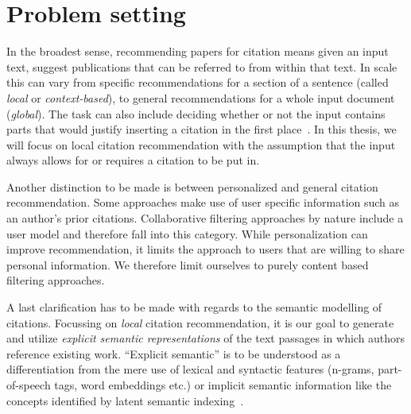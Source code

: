 


\section{Problem setting}\label{sec:problemsetting}
In the broadest sense, recommending papers for citation means given an input text, suggest publications that can be referred to from within that text. In scale this can vary from specific recommendations for a section of a sentence (called \emph{local} or \emph{context-based}), to general recommendations for a whole input document (\emph{global}). The task can also include deciding whether or not the input contains parts that would justify inserting a citation in the first place~\cite{He2011}. In this thesis, we will focus on local citation recommendation with the assumption that the input always allows for or requires a citation to be put in.

Another distinction to be made is between personalized and general citation recommendation. Some approaches make use of user specific information such as an author's prior citations. Collaborative filtering approaches by nature include a user model and therefore fall into this category. While personalization can improve recommendation, it limits the approach to users that are willing to share personal information. %
We therefore limit ourselves to purely content based filtering approaches.

A last clarification has to be made with regards to the semantic modelling of citations. Focussing on \emph{local} citation recommendation, it is our goal to generate and utilize \emph{explicit semantic representations} of the text passages in which authors reference existing work. ``Explicit semantic'' is to be understood as a differentiation from the mere use of lexical and syntactic features (n-grams, part-of-speech tags, word embeddings etc.) or implicit semantic information like the concepts identified by latent semantic indexing~\cite{Deerwester1990}.

